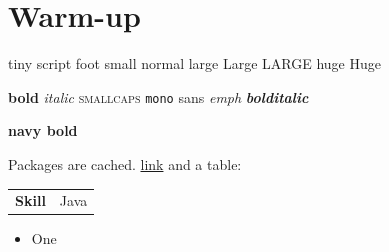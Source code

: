 \documentclass[10pt,legalpaper]{article}
\begin{document}
\section*{Warm-up}
\tiny tiny \scriptsize script \footnotesize foot \small small \normalsize normal \large large \Large Large \LARGE LARGE \huge huge \Huge Huge\par
\textbf{bold} \textit{italic} \textsc{smallcaps} \texttt{mono} \textsf{sans} \emph{emph} \textbf{\textit{bolditalic}}\par
\color{navyblue}\bfseries navy bold\normalfont \par
\titleformat{\section}{\bfseries}{}{0em}{}
Packages are cached. \href{https://example.com}{link} and a table:
\begin{tabularx}{\linewidth}{@{} >{\bfseries}l X @{}} Skill & Java \end{tabularx}
\begin{itemize}[leftmargin=*] \item One \end{itemize}
\end{document}
